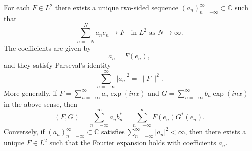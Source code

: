 For each $F \in L^2$ there exists a unique two-sided sequence $(a_n)_{n=-\infty}^{\infty} \subset \mathbb{C}$ such that
$$\sum_{n=-N}^{N} a_n e_n \to F \quad \text{in } L^2 \text{ as } N \to \infty.$$
The coefficients are given by
$$a_n = F(e_n),$$
and they satisfy Parseval's identity
$$\sum_{n=-\infty}^{\infty} |a_n|^2 = \|F\|^2.$$
More generally, if $F = \sum_{n=-\infty}^{\infty} a_n \exp(inx)$ and $G = \sum_{n=-\infty}^{\infty} b_n \exp(inx)$ in the above sense, then
$$(F, G) = \sum_{n=-\infty}^{\infty} a_n b_n^* = \sum_{n=-\infty}^{\infty} F(e_n) G^*(e_n).$$
Conversely, if $(a_n)_{n=-\infty}^{\infty} \subset \mathbb{C}$ satisfies $\sum_{n=-\infty}^{\infty} |a_n|^2 < \infty$, then there exists a unique $F \in L^2$ such that the Fourier expansion holds with coefficients $a_n$.
